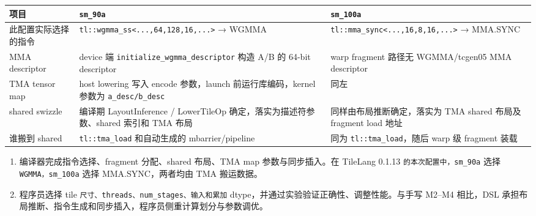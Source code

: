 \documentclass[11pt,a4paper,fontset=fandol]{ctexart}
\begin{document}
\begin{answer}
\begin{longtable}[]{@{}
  >{\raggedright\arraybackslash}p{}
  >{\raggedright\arraybackslash}p{}
  >{\raggedright\arraybackslash}p{}@{}}
\toprule\noalign{}
\begin{minipage}[b]{\linewidth}\raggedright
项目
\end{minipage} & \begin{minipage}[b]{\linewidth}\raggedright
\texttt{sm\_\allowbreak{}90a}
\end{minipage} & \begin{minipage}[b]{\linewidth}\raggedright
\texttt{sm\_\allowbreak{}100a}
\end{minipage} \\
\midrule\noalign{}
\endhead
\bottomrule\noalign{}
\endlastfoot
此配置实际选择的指令 &
\texttt{tl:\allowbreak{}:\allowbreak{}wgmma\_\allowbreak{}ss\textless{}.\allowbreak{}.\allowbreak{}.\allowbreak{},\allowbreak{}64,\allowbreak{}128,\allowbreak{}16,\allowbreak{}.\allowbreak{}.\allowbreak{}.\allowbreak{}\textgreater{}}
→ WGMMA &
\texttt{tl:\allowbreak{}:\allowbreak{}mma\_\allowbreak{}sync\textless{}.\allowbreak{}.\allowbreak{}.\allowbreak{},\allowbreak{}16,\allowbreak{}8,\allowbreak{}16,\allowbreak{}.\allowbreak{}.\allowbreak{}.\allowbreak{}\textgreater{}}
→ MMA.SYNC \\
MMA descriptor & device 端
\texttt{initialize\_\allowbreak{}wgmma\_\allowbreak{}descriptor} 构造
A/B 的 64-bit descriptor & warp fragment 路径无 WGMMA/tcgen05 MMA
descriptor \\
TMA tensor map & host lowering 写入 encode 参数，launch
前运行库编码，kernel 参数为
\texttt{a\_\allowbreak{}desc/\allowbreak{}b\_\allowbreak{}desc} &
同左 \\
shared swizzle & 编译期 LayoutInference / LowerTileOp
确定，落实为描述符参数、shared 索引和 TMA 布局 &
同样由布局推断确定，落实为 TMA shared 布局及 fragment load 地址 \\
谁搬到 shared &
\texttt{tl:\allowbreak{}:\allowbreak{}tma\_\allowbreak{}load}
和自动生成的 mbarrier/pipeline & 同为
\texttt{tl:\allowbreak{}:\allowbreak{}tma\_\allowbreak{}load}，随后 warp
级 fragment 装载 \\
\end{longtable}

\begin{enumerate}
\def\labelenumi{(\alph{enumi})}
\item
  编译器完成指令选择、fragment 分配、shared 布局、TMA map
  参数与同步插入。在 TileLang 0.1.13
  \texttt{的本次配置中，sm\_\allowbreak{}90a} 选择
  \texttt{WGMMA，sm\_\allowbreak{}100a} 选择 MMA.SYNC，两者均由 TMA
  搬运数据。
\item
  程序员选择 tile
  \texttt{尺寸、threads、num\_\allowbreak{}stages、输入和累加}
  dtype，并通过实验验证正确性、调整性能。与手写 M2--M4 相比，DSL
  承担布局推断、指令生成和同步插入，程序员侧重计算划分与参数调优。
\end{enumerate}


\end{answer}
\end{document}
